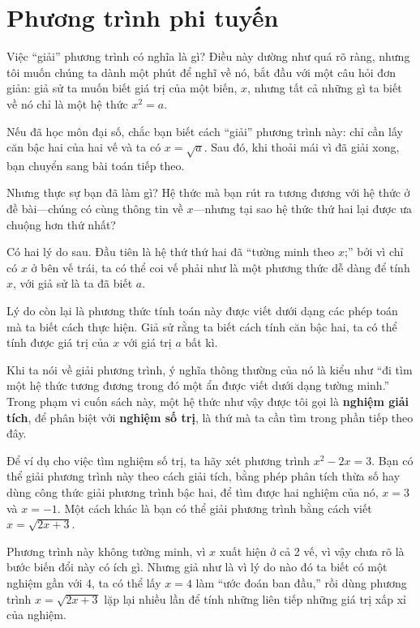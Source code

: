 \documentclass[12pt]{book}
\begin{document}
\section{Phương trình phi tuyến}

Việc ``giải'' phương trình có nghĩa là gì? Điều này dường như quá
rõ ràng, nhưng tôi muốn chúng ta dành một phút để nghĩ về nó,
bắt đầu với một câu hỏi đơn giản: giả sử ta muốn biết giá trị của
một biến, $x$, nhưng tất cả những gì ta biết về nó chỉ là một 
hệ thức $x^2 = a$.

Nếu đã học môn đại số, chắc bạn biết cách ``giải'' phương trình
này: chỉ cần lấy căn bậc hai của hai vế và ta có $x = \sqrt{a}$. 
Sau đó, khi thoải mái vì đã giải xong, bạn chuyển sang bài toán
tiếp theo.

Nhưng thực sự bạn đã làm gì? Hệ thức mà bạn rút ra tương đương
với hệ thức ở đề bài---chúng có cùng thông tin về $x$---nhưng
tại sao hệ thức thứ hai lại được ưa chuộng hơn thứ nhất?

Có hai lý do sau. Đầu tiên là hệ thứ thứ hai đã ``tường minh
theo $x$;'' bởi vì chỉ có $x$ ở bên vế trái, ta có thể coi vế phải
như là một phương thức dễ dàng để tính $x$, với giả sử là ta
đã biết $a$.

Lý do còn lại là phương thức tính toán này được viết dưới dạng các
phép toán mà ta biết cách thực hiện. Giả sử rằng ta biết cách tính
căn bậc hai, ta có thể tính được giá trị của $x$ với giá trị $a$ bất kì.

Khi ta nói về giải phương trình, ý nghĩa thông thường của nó là 
kiểu như ``đi tìm một hệ thức tương đương trong đó một ẩn được
viết dưới dạng tường minh.'' Trong phạm vi cuốn sách này, một
hệ thức như vậy được tôi gọi là {\bf nghiệm giải tích}, để phân biệt
với {\bf nghiệm số trị}, là thứ mà ta cần tìm trong phần tiếp theo đây.

Để ví dụ cho việc tìm nghiệm số trị, ta hãy xét phương trình $x^2 - 2x = 3$. 
Bạn có thể giải phương trình này theo cách giải tích, bằng phép
phân tích thừa số hay dùng công thức giải phương trình bậc hai, để
tìm được hai nghiệm của nó, $x=3$ và $x=-1$. Một cách khác là bạn
có thể giải phương trình bằng cách viết $x = \sqrt{2x+3}$.

Phương trình này không tường minh, vì $x$ xuất hiện ở cả 2 vế, 
vì vậy chưa rõ là bước biến đổi này có ích gì. Nhưng giả như là
vì lý do nào đó ta biết có một nghiệm gần với 4, ta có thể 
lấy $x=4$ làm ``ước đoán ban đầu,'' rồi dùng phương trình
$x = \sqrt{2x+3}$ lặp lại nhiều lần để tính những liên tiếp những
giá trị xấp xỉ của nghiệm.
\end{document}
